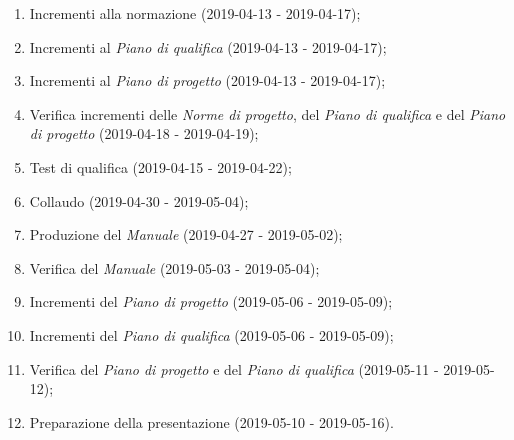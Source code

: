 	\begin{enumerate}[label= 5.\arabic*)]
		\item Incrementi alla normazione (2019-04-13 - 2019-04-17);
		\item Incrementi al \textit{Piano di qualifica} (2019-04-13 - 2019-04-17);
		\item Incrementi al \textit{Piano di progetto} (2019-04-13 - 2019-04-17);
		\item Verifica incrementi delle \textit{Norme di progetto}, del \textit{Piano di qualifica} e del \textit{Piano di progetto} (2019-04-18 - 2019-04-19);
		\item Test di qualifica (2019-04-15 - 2019-04-22);
		\item Collaudo (2019-04-30 - 2019-05-04);
		\item Produzione del \textit{Manuale} (2019-04-27 - 2019-05-02);
		\item Verifica del \textit{Manuale} (2019-05-03 - 2019-05-04);
		\item Incrementi del \textit{Piano di progetto} (2019-05-06 - 2019-05-09);
		\item Incrementi del \textit{Piano di qualifica} (2019-05-06 - 2019-05-09);
		\item Verifica del \textit{Piano di progetto} e del \textit{Piano di qualifica} (2019-05-11 - 2019-05-12);
		\item Preparazione della presentazione (2019-05-10 - 2019-05-16).
	\end{enumerate}


